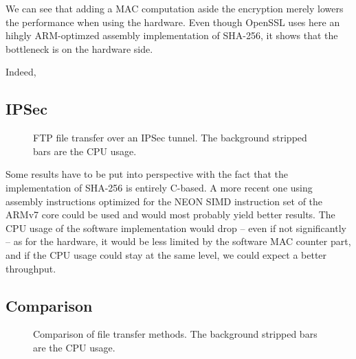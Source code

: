 We can see that adding a MAC computation aside the encryption merely lowers the performance when using the hardware.
Even though OpenSSL uses here an hihgly ARM-optimzed assembly implementation of SHA-256, it shows that the bottleneck is on the hardware side.

Indeed, 

\subsection{IPSec}

\begin{figure}[ht]

\caption{FTP file transfer over an IPSec tunnel. The background stripped bars are the CPU usage.}
\label{fig:ipsec-ftp-bench}
\end{figure}

Some results have to be put into perspective with the fact that the implementation of SHA-256 is entirely C-based.
A more recent one using assembly instructions optimized for the NEON SIMD instruction set of the ARMv7 core could be used and would most probably yield better results.
The CPU usage of the software implementation would drop -- even if not significantly -- as for the hardware, it would be less limited by the software MAC counter part, and if the CPU usage could stay at the same level, we could expect a better throughput.

\subsection{Comparison}

\begin{figure}[ht]

\caption{Comparison of file transfer methods. The background stripped bars are the CPU usage.}
\label{fig:ftp-bench-comparison}
\end{figure}